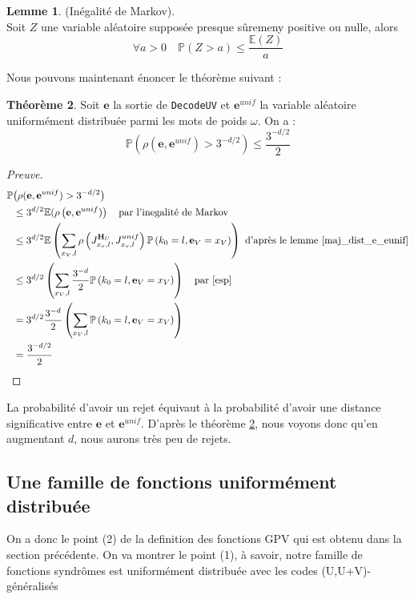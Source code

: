 \documentclass[12pt]{article}
\theoremstyle{definition}
\newtheorem{thm}{Théorème}[section]
\newtheorem{lemme}[thm]{Lemme}
\newcommand{\e}{\mathbf{e}}
\begin{document}
\begin{lemme}\label{markov}(Inégalité de Markov).\\
Soit $Z$ une variable aléatoire supposée presque sûremeny positive ou nulle, alors $$\forall a>0\quad \mathbb{P}(Z > a) \leq \frac{\mathbb{E}(Z)}{a}$$
\end{lemme}

Nous pouvons maintenant énoncer le théorème suivant :

\begin{thm}\label{rejet}
Soit $\e$ la sortie de \verb|DecodeUV| et $\e^{unif}$ la variable aléatoire uniformément distribuée parmi les mots de poids $\omega$. On a :
$$ \mathbb{P}\left(\rho(\e,\e^{unif})>3^{-d/2}\right) \leq \frac{3^{-d/2}}{2} $$
\end{thm}

\begin{proof}[Preuve]
\begin{equation*}
\begin{split}
\mathbb{P}&\big(\rho(\e,\e^{unif})>3^{-d/2}\big) \\
&\leq 3^{d/2}\mathbb{E}(\rho\left(\e,\e^{unif})\right) \quad \text{par l'inegalité de Markov}\\
&\leq 3^{d/2}\mathbb{E}\left(\sum\limits_{x_V,l} \rho\left(J_{x_v,l}^{\mathbf{H}_U},J_{x_v,l}^{unif}\right)\mathbb{P}\left(k_0 = l , \e_V = x_V\right)\right) \text{ d'après le lemme \ref{maj_dist_e_eunif}}\\
&\leq 3^{d/2}\left(\sum\limits_{x_V,l} \frac{3^{-d}}{2}\mathbb{P}\left(k_0 = l ,\e_V = x_V\right)\right) \quad \text{par \eqref{esp}}\\
&= 3^{d/2} \frac{3^{-d}}{2}\left(\sum\limits_{x_V,l}\mathbb{P}\left(k_0 = l ,\e_V = x_V\right)\right) \\
&= \frac{3^{-d/2}}{2}\\
\end{split}
\end{equation*}
\end{proof}


La probabilité d'avoir un rejet équivaut à la probabilité d'avoir une distance significative entre $\e$ et $\e^{unif}$. D'après le théorème \ref{rejet}, nous voyons donc qu'en augmentant $d$, nous aurons très peu de rejets.


\subsection{Une famille de fonctions uniformément distribuée}
On a donc le point (2) de la definition des fonctions GPV qui est obtenu dans la section précédente. On va montrer le point (1), à savoir, notre famille de fonctions syndrômes est uniformément distribuée avec les codes (U,U+V)-généralisés \\
\end{document}
